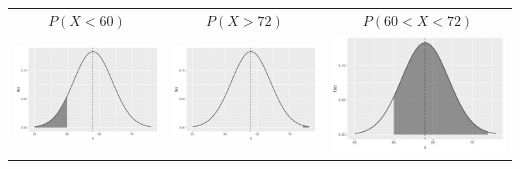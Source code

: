 \begin{frame}

  \begin{block}{\examplectd}
    \begin{center}
    \begin{tabular}{ccc}
    $P(X < 60)$ & $P(X > 72)$ & $P(60 < X < 72)$
    \\
    \includegraphics[height = .35\textheight]{figure/exercise-20-2}
      &
        \includegraphics[height = .35\textheight]{figure/exercise-20-3}
        &
      \includegraphics[height = .35\textheight]{figure/exercise-20-4}
    \end{tabular}
    \end{center}
  \end{block}
  

\end{frame}
